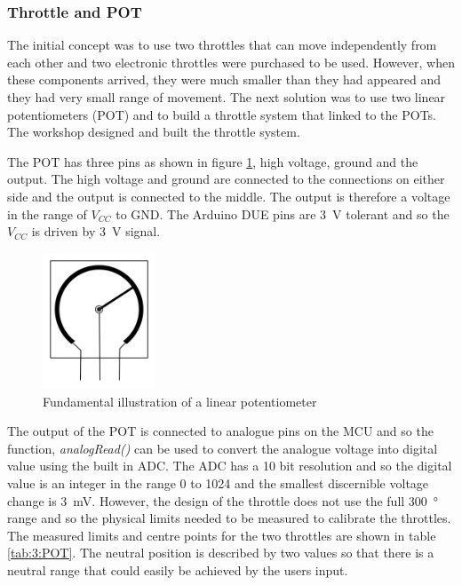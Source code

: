 		\subsubsection{Throttle and POT}
		The initial concept was to use two throttles that can move independently from each other and %
		two electronic throttles were 
		purchased to be used. However, when these components arrived, they were much smaller than they had appeared and they had very small range of movement. The next solution was to use two linear potentiometers (POT) and to build a throttle system that linked to the POTs. The workshop designed and built the throttle system.
		\par
		\vspace{0.4cm}
		The POT has three pins as shown in figure \ref{fig:3:POTdraw}, high voltage, ground and the output. The high voltage and ground are connected to the connections on either side and the output is connected to the middle. The output is therefore a voltage in the range of $V_{CC}$ to GND. The Arduino DUE pins are \SI{3}{\volt} tolerant and so the $V_{CC}$ is driven by \SI{3}{\volt} signal. \par
		\vspace{0.4cm}
		\begin{figure}[ht]
			\begin{center}
				\includegraphics[width = 0.3\textwidth]{figures/POT.jpg}
				\caption{Fundamental illustration of a linear potentiometer}
				\label{fig:3:POTdraw}
			\end{center}
		\end{figure}
		The output of the POT is connected to analogue pins on the MCU and so the function, \textit{analogRead()} can be used to convert the analogue voltage into digital value using the built in ADC. The ADC has a 10 bit resolution and so the digital value is an integer in the range 0 to 1024 and the smallest discernible voltage change is \SI{3}{\milli\volt}. However, the design of the throttle does not use the full \SI{300}{\degree} range and so the physical limits needed to be measured to calibrate the throttles. The measured limits and centre points for the two throttles are shown in table \ref{tab:3:POT}. The neutral position is described by two values so that there is a neutral range that could easily be achieved by the users input. \par

